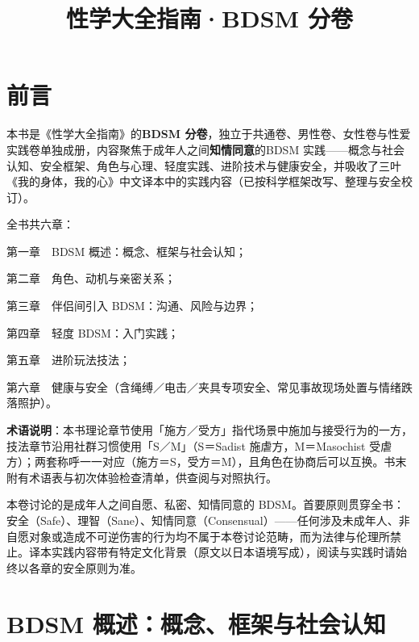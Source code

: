 \documentclass[12pt,UTF8]{ctexbook}
\title{\heiti\zihao{0} 性学大全指南·BDSM 分卷}
\author{}
\date{}
\newcommand{\keyword}[1]{\textbf{#1}}
\begin{document}
\maketitle

\frontmatter

\chapter{前言}

本书是《性学大全指南》的\keyword{BDSM 分卷}，独立于共通卷、男性卷、女性卷与性爱实践卷单独成册，内容聚焦于成年人之间\keyword{知情同意}的BDSM 实践——概念与社会认知、安全框架、角色与心理、轻度实践、进阶技术与健康安全，并吸收了三叶《我的身体，我的心》中文译本中的实践内容（已按科学框架改写、整理与安全校订）。

全书共六章：

第一章　BDSM 概述：概念、框架与社会认知；

第二章　角色、动机与亲密关系；

第三章　伴侣间引入 BDSM：沟通、风险与边界；

第四章　轻度 BDSM：入门实践；

第五章　进阶玩法技法；

第六章　健康与安全（含绳缚／电击／夹具专项安全、常见事故现场处置与情绪跌落照护）。

\textbf{术语说明}：本书理论章节使用「施方／受方」指代场景中施加与接受行为的一方，技法章节沿用社群习惯使用「S／M」（S＝Sadist 施虐方，M＝Masochist 受虐方）；两套称呼一一对应（施方＝S，受方＝M），且角色在协商后可以互换。书末附有术语表与初次体验检查清单，供查阅与对照执行。

\begin{tcolorbox}[colback=pink!5!white,colframe=red!50!black,title=使用说明]
本卷讨论的是成年人之间自愿、私密、知情同意的 BDSM。首要原则贯穿全书：安全（Safe）、理智（Sane）、知情同意（Consensual）——任何涉及未成年人、非自愿对象或造成不可逆伤害的行为均不属于本卷讨论范畴，而为法律与伦理所禁止。译本实践内容带有特定文化背景（原文以日本语境写成），阅读与实践时请始终以各章的安全原则为准。
\end{tcolorbox}

\tableofcontents

\mainmatter

\chapter{BDSM 概述：概念、框架与社会认知}
\end{document}
